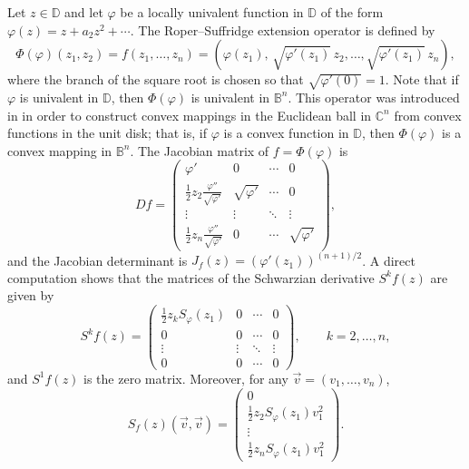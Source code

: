 \documentclass[12pt]{amsart}
\theoremstyle{definition}
\theoremstyle{remark}
\numberwithin{equation}{section}
\begin{document}
Let $z\in \mathbb{D}$ and let $\varphi$ be a locally univalent function in
$\mathbb{D}$ of the form $\varphi(z)=z+a_2z^2+\cdots$. The Roper--Suffridge
extension operator is defined by
\begin{equation}\label{roper-suff}
\Phi(\varphi)(z_1,z_2)=f(z_1,\ldots,z_n)
=\left(\varphi(z_1),\,\sqrt{\varphi'(z_1)}\,z_2,
\ldots,\sqrt{\varphi'(z_1)}\,z_n\right),
\end{equation}
where the branch of the square root is chosen so that $\sqrt{\varphi'(0)}=1$.
Note that if $\varphi$ is univalent in $\mathbb{D}$, then $\Phi(\varphi)$ is
univalent in $\mathbb{B}^n$. This operator was introduced in \cite{RS} in order
to construct convex mappings in the Euclidean ball in $\mathbb{C}^n$ from
convex functions in the unit disk; that is, if $\varphi$ is a convex function
in $\mathbb{D}$, then $\Phi(\varphi)$ is a convex mapping in $\mathbb{B}^n$.
The Jacobian matrix of $f=\Phi(\varphi)$ is
\[
Df =\begin{pmatrix}
  \varphi' & 0 & \cdots & 0 \\
  \frac{1}{2}z_2\frac{\varphi''}{\sqrt{\varphi'}} & \sqrt{\varphi'} & \cdots & 0 \\
  \vdots & \vdots & \ddots & \vdots \\
  \frac{1}{2}z_n\frac{\varphi''}{\sqrt{\varphi'}} & 0 & \cdots & \sqrt{\varphi'}
\end{pmatrix},
\]
and the Jacobian determinant is $J_f(z)=(\varphi'(z_1))^{(n+1)/2}$. A direct
computation shows that the matrices of the Schwarzian derivative $S^kf(z)$ are
given by
\[
S^kf(z)=\begin{pmatrix}
  \frac{1}{2}z_k S_\varphi(z_1) & 0 & \cdots & 0 \\
  0 & 0 & \cdots & 0 \\
  \vdots & \vdots & \ddots & \vdots \\
  0 & 0 & \cdots & 0
\end{pmatrix},
\qquad k=2,\ldots,n,
\]
and $S^1f(z)$ is the zero matrix. Moreover, for any
$\vec{v}=(v_1,\ldots,v_n)$,
\[
S_f(z)(\vec{v},\vec{v}) =
\begin{pmatrix}
  0 \\
  \frac{1}{2}z_2 S_\varphi(z_1)v_1^2 \\
  \vdots \\
  \frac{1}{2}z_n S_\varphi(z_1)v_1^2
\end{pmatrix}.
\]
\end{document}
